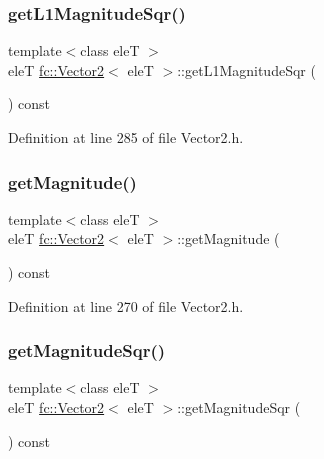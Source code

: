 \subsubsection{\texorpdfstring{get\+L1\+Magnitude\+Sqr()}{getL1MagnitudeSqr()}}
{\footnotesize\ttfamily template$<$class eleT $>$ \\
eleT \hyperlink{classfc_1_1Vector2}{fc\+::\+Vector2}$<$ eleT $>$\+::get\+L1\+Magnitude\+Sqr (\begin{DoxyParamCaption}{ }\end{DoxyParamCaption}) const}



Definition at line 285 of file Vector2.\+h.

\mbox{\label{classfc_1_1Vector2_a9a093d6e5b12bd014a66a2202edaf84d}} 
\subsubsection{\texorpdfstring{get\+Magnitude()}{getMagnitude()}}
{\footnotesize\ttfamily template$<$class eleT $>$ \\
eleT \hyperlink{classfc_1_1Vector2}{fc\+::\+Vector2}$<$ eleT $>$\+::get\+Magnitude (\begin{DoxyParamCaption}{ }\end{DoxyParamCaption}) const}



Definition at line 270 of file Vector2.\+h.

\mbox{\label{classfc_1_1Vector2_a936d1ee4ee9945867b816f91d2a6f3f5}} 
\subsubsection{\texorpdfstring{get\+Magnitude\+Sqr()}{getMagnitudeSqr()}}
{\footnotesize\ttfamily template$<$class eleT $>$ \\
eleT \hyperlink{classfc_1_1Vector2}{fc\+::\+Vector2}$<$ eleT $>$\+::get\+Magnitude\+Sqr (\begin{DoxyParamCaption}{ }\end{DoxyParamCaption}) const}



